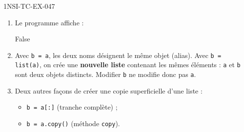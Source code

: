\begin{corrige}{1NSI-TC-EX-047}
\begin{enumerate}
  \item Le programme affiche :
\begin{console}
[1, 2, 3]
[1, 2, 3, 4]
False
\end{console}

  \item Avec \lstinline{b = a}, les deux noms désignent le même objet (alias). Avec \lstinline{b = list(a)}, on crée une \textbf{nouvelle liste} contenant les mêmes éléments : \lstinline{a} et \lstinline{b} sont deux objets distincts. Modifier \lstinline{b} ne modifie donc pas \lstinline{a}.

  \item Deux autres façons de créer une copie superficielle d'une liste :
  \begin{itemize}
    \item \lstinline{b = a[:]} (tranche complète) ;
    \item \lstinline{b = a.copy()} (méthode \lstinline{copy}).
  \end{itemize}
\end{enumerate}
\end{corrige}
